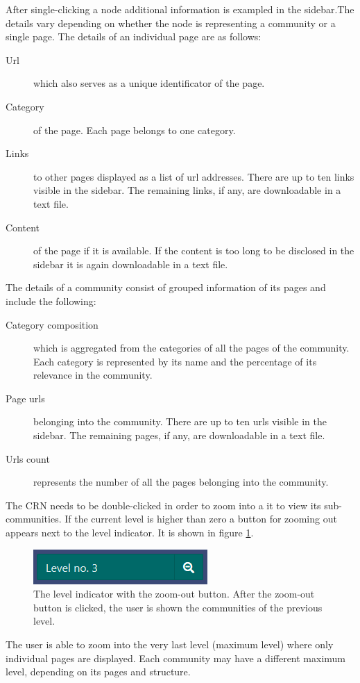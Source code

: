 After single-clicking a node additional information is exampled in the sidebar.The details vary depending on whether the node is representing a community or a single page.  
The details of an individual page are as follows: 
\begin {description}
	\item [Url] which also serves as a unique identificator of the page. 
	\item [Category] of the page. Each page belongs to one category.
	\item[Links] to other pages displayed as a list of url addresses. There are up to ten links visible in the sidebar. The remaining links, if any, are downloadable in a text file. 
	\item[Content] of the page if it is available. If the content is too long to be disclosed in the sidebar it is again downloadable in a text file.
\end{description}


The details of a community consist of  grouped information of its pages and include the following:
\begin {description}
	\item [Category composition] which is aggregated from the categories of all the pages of the community. Each category is represented by its name and the percentage of its relevance in the community.
	\item [Page urls] belonging into the community. There are up to ten urls visible in the sidebar. The remaining pages, if any, are downloadable in a text file. 
	\item[Urls count]represents the number of all the pages belonging into the community. 
\end{description}


The CRN needs to be double-clicked in order to zoom into a it to view its sub-communities. If the current level is higher than zero a button for zooming out appears next to the level indicator. It is shown in figure \ref{levelIndicatorWithButton}.
\begin{figure}[ht!]
  \centering
  \includegraphics{Images/levelIndicatorWithButton.png}
  \caption{The level indicator with the zoom-out button. After the zoom-out button is clicked, the user is shown the communities of the previous level.}
  \label{levelIndicatorWithButton}
\end{figure} 


The user is able to zoom into the very last level (maximum level) where only individual pages are displayed. Each community may have a different maximum level, depending on its pages and structure.


